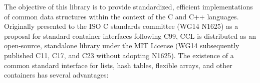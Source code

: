 The objective of this library is to provide standardized, efficient implementations of common data structures within the context of the C and C++ languages. Originally presented to the ISO C standards committee (WG14 N1625) as a proposal for standard container interfaces following C99, CCL is distributed as an open-source, standalone library under the MIT License (WG14 subsequently published C11, C17, and C23 without adopting N1625). The existence of a common standard interface for lists, hash tables, flexible arrays, and other containers has several advantages:
